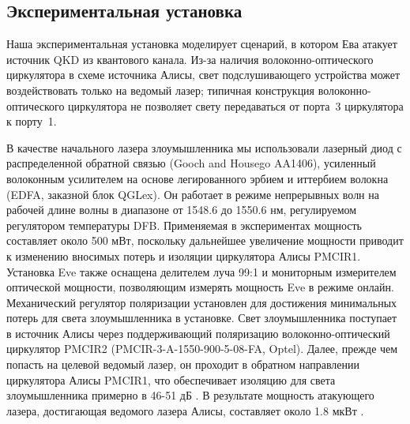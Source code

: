 \subsection{Экспериментальная установка}

Наша экспериментальная установка моделирует сценарий, в котором Ева атакует источник QKD из квантового канала. Из-за наличия волоконно-оптического циркулятора в схеме источника Алисы, свет подслушивающего устройства может воздействовать только на ведомый лазер; типичная конструкция волоконно-оптического циркулятора не позволяет свету передаваться от порта~3 циркулятора к порту~1.

В качестве начального лазера злоумышленника мы использовали лазерный диод с распределенной обратной связью (Gooch and Housego AA1406), усиленный волоконным усилителем на основе легированного эрбием и иттербием волокна (EDFA, заказной блок QGLex)\cite{huang2020}. Он работает в режиме непрерывных волн на рабочей длине волны в диапазоне от 1548.6  до 1550.6 нм, регулируемом регулятором температуры DFB. Применяемая в экспериментах мощность составляет около 500 мВт, поскольку дальнейшее увеличение мощности приводит к изменению вносимых потерь и изоляции циркулятора Алисы PMCIR1. Установка Eve также оснащена делителем луча 99:1 и мониторным измерителем оптической мощности, позволяющим измерять мощность Eve в режиме онлайн. Механический регулятор поляризации установлен для достижения минимальных потерь для света злоумышленника в установке. Свет злоумышленника поступает в источник Алисы через поддерживающий поляризацию волоконно-оптический циркулятор PMCIR2 (PMCIR-3-A-1550-900-5-08-FA, Optel). Далее, прежде чем попасть на целевой ведомый лазер, он проходит в обратном направлении циркулятора Алисы PMCIR1, что обеспечивает изоляцию для света злоумышленника примерно в 46-51 дБ . В результате мощность атакующего лазера, достигающая ведомого лазера Алисы, составляет около 1.8 мкВт .

